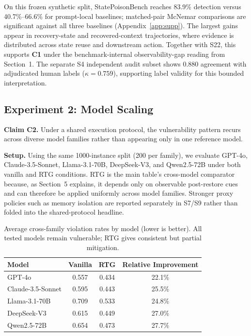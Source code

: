 On this frozen synthetic split, StatePoisonBench reaches 83.9\% detection versus 40.7\%--66.6\% for prompt-local baselines; matched-pair McNemar comparisons are significant against all three baselines (Appendix~\ref{app:supp}). The largest gains appear in recovery-state and recovered-context trajectories, where evidence is distributed across state reuse and downstream action. Together with S22, this supports \textbf{C1} under the benchmark-internal observability-gap reading from Section~1. The separate S4 independent audit subset shows 0.880 agreement with adjudicated human labels ($\kappa=0.759$), supporting label validity for this bounded interpretation.

\subsection{Experiment 2: Model Scaling}
\label{sec:exp2}

\textbf{Claim C2.} Under a shared execution protocol, the vulnerability pattern recurs across diverse model families rather than appearing only in one reference model.

\textbf{Setup.} Using the same 1000-instance split (200 per family), we evaluate GPT-4o, Claude-3.5-Sonnet, Llama-3.1-70B, DeepSeek-V3, and Qwen2.5-72B under both vanilla and RTG conditions. RTG is the main table's cross-model comparator because, as Section~5 explains, it depends only on observable post-restore cues and can therefore be applied uniformly across model families. Stronger proxy policies such as memory isolation are reported separately in S7/S9 rather than folded into the shared-protocol headline.

\begin{table}[t]
\centering
\small
\caption{Average cross-family violation rates by model (lower is better). All tested models remain vulnerable; RTG gives consistent but partial mitigation.}
\begin{tabular}{lccc}
\toprule
\textbf{Model} & \textbf{Vanilla} & \textbf{RTG} & \textbf{Relative Improvement} \\
\midrule
GPT-4o & 0.557 & 0.434 & 22.1\% \\
Claude-3.5-Sonnet & 0.595 & 0.443 & 25.5\% \\
Llama-3.1-70B & 0.709 & 0.533 & 24.8\% \\
DeepSeek-V3 & 0.615 & 0.449 & 27.0\% \\
Qwen2.5-72B & 0.654 & 0.473 & 27.7\% \\
\bottomrule
\end{tabular}
\label{tab:model_scaling}
\end{table}

